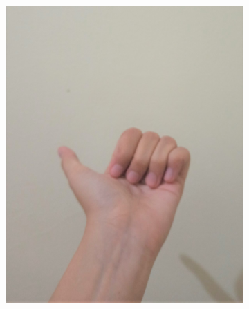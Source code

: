 \documentclass[conference]{IEEEtran}
\begin{document}
\begin{figure} [h]
\begin{center}
\begin{subfigure}[t]{0.11\textwidth}
			\includegraphics[width=\textwidth]{img/pola5a.jpg}
			\caption{\label{fig:gs5a}}
		\end{subfigure}
		\hspace{0.1em}
		\begin{subfigure}[t]{0.11\textwidth}
			\centering

\end{subfigure}
\end{center}
\end{figure}
\end{document}
